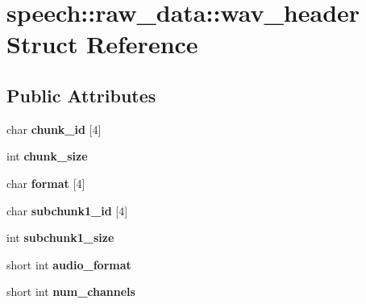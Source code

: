 \hypertarget{structspeech_1_1raw__data_1_1wav__header}{\section{speech\+:\+:raw\+\_\+data\+:\+:wav\+\_\+header Struct Reference}
\label{structspeech_1_1raw__data_1_1wav__header}
}
\subsection*{Public Attributes}
\begin{DoxyCompactItemize}
\item 
\hypertarget{structspeech_1_1raw__data_1_1wav__header_aa21e9d3717f09b9fdb6858d63ce07536}{char {\bfseries chunk\+\_\+id} \mbox{[}4\mbox{]}}\label{structspeech_1_1raw__data_1_1wav__header_aa21e9d3717f09b9fdb6858d63ce07536}

\item 
\hypertarget{structspeech_1_1raw__data_1_1wav__header_a547c4d3fda743ec9357740a575ec2422}{int {\bfseries chunk\+\_\+size}}\label{structspeech_1_1raw__data_1_1wav__header_a547c4d3fda743ec9357740a575ec2422}

\item 
\hypertarget{structspeech_1_1raw__data_1_1wav__header_aed4df24a7d029bda68a4944971eed1c2}{char {\bfseries format} \mbox{[}4\mbox{]}}\label{structspeech_1_1raw__data_1_1wav__header_aed4df24a7d029bda68a4944971eed1c2}

\item 
\hypertarget{structspeech_1_1raw__data_1_1wav__header_a0d8b3070e3abf0c04feecbe9109abe9e}{char {\bfseries subchunk1\+\_\+id} \mbox{[}4\mbox{]}}\label{structspeech_1_1raw__data_1_1wav__header_a0d8b3070e3abf0c04feecbe9109abe9e}

\item 
\hypertarget{structspeech_1_1raw__data_1_1wav__header_ae64a9825c689d3095688dca5915cdef5}{int {\bfseries subchunk1\+\_\+size}}\label{structspeech_1_1raw__data_1_1wav__header_ae64a9825c689d3095688dca5915cdef5}

\item 
\hypertarget{structspeech_1_1raw__data_1_1wav__header_a0c59f8f100613ba4ff6895f4564fae4f}{short int {\bfseries audio\+\_\+format}}\label{structspeech_1_1raw__data_1_1wav__header_a0c59f8f100613ba4ff6895f4564fae4f}

\item 
\hypertarget{structspeech_1_1raw__data_1_1wav__header_ae7fd75d94da1ba6e13f75f1b8a28fe72}{short int {\bfseries num\+\_\+channels}}\label{structspeech_1_1raw__data_1_1wav__header_ae7fd75d94da1ba6e13f75f1b8a28fe72}


\end{DoxyCompactItemize}
